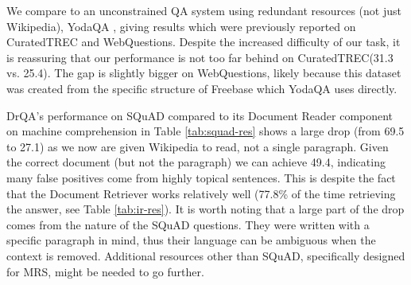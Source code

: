 \documentclass[11pt,a4paper]{article}
\newcommand\sq{SimpleQuestions\xspace}
\newcommand\lcurq{CuratedTREC\xspace}
\newcommand\wikim{WikiMovies\xspace}
\newcommand\wq{WebQuestions\xspace}
\newcommand\us{DrQA\xspace}
\begin{document}
We compare to an unconstrained QA system using redundant resources (not just Wikipedia), YodaQA \cite{baudivs2015yodaqa}, giving results which were previously reported on \lcurq and \wq. Despite the increased difficulty of our task, it is reassuring that our performance is not too far behind on \lcurq (31.3 vs. 25.4). The gap is slightly bigger on \wq, likely because this dataset was created from the specific structure of Freebase which YodaQA uses directly.

\us's performance on SQuAD compared to its Document Reader component on machine comprehension in Table \ref{tab:squad-res} shows a large drop (from 69.5 to 27.1)
as we now are given Wikipedia to read, not a single paragraph.
%
Given the correct document (but not the paragraph) we can achieve 49.4, indicating many false positives
come from highly topical sentences.
%
This is despite the fact that the Document Retriever works relatively well (77.8\% of the time retrieving the answer, see Table \ref{tab:ir-res}).
%
It is worth noting that a large part of the drop comes from the nature of the SQuAD questions. They were written with a specific paragraph in mind, thus their language can be ambiguous when the context is removed. Additional resources other than SQuAD, specifically designed for MRS, might be needed to go further.
%


%
%



%
\end{document}
